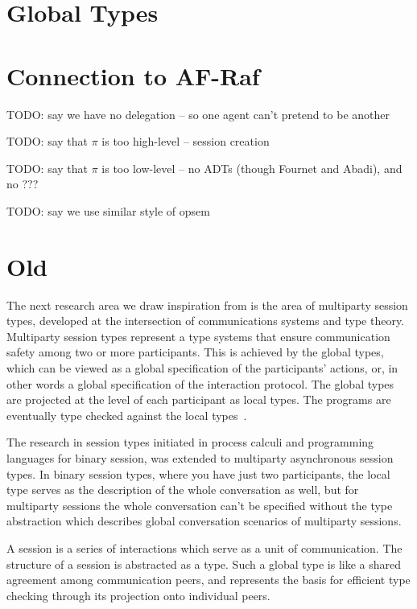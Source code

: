 \documentclass[a4paper,12pt,oneside,fleqn]{book} %
\begin{document}
\section{Global Types}
\label{sec:mast-global}

\section{Connection to AF-Raf}
\label{sec:mast-vs-afraf}

TODO: say we have no delegation -- so one agent can't pretend to be another

TODO: say that $\pi$ is too high-level -- session creation

TODO: say that $\pi$ is too low-level
  -- no ADTs (though Fournet and Abadi), and no ???

TODO: say we use similar style of opsem

\section{Old}



The next research area we draw inspiration from is the area of multiparty
session types, developed at the intersection of communications systems and
type theory. Multiparty session types represent a type systems that ensure
communication safety among two or more participants. This is achieved by
the global types, which can be viewed as a global specification of the
participants' actions, or, in other words a global specification of the
interaction protocol. The global types are projected at the level of each
participant as local types. The programs are eventually type checked
against the local types~\cite{DBLP:journals/jacm/HondaYC16}.

The research in session types initiated in process calculi and programming
languages for binary session, was extended to multiparty asynchronous
session types. In binary session types, where you have just two
participants, the local type serves as the description of the whole
conversation as well, but for multiparty sessions the whole conversation
can't be specified without the type abstraction which describes global
conversation scenarios of multiparty sessions.~\cite{DBLP:journals/jacm/HondaYC16}

A session is a series of interactions which serve as a unit of
communication. The structure of a session is abstracted as a type. Such a
global type is like a shared agreement among communication peers, and
represents the basis for efficient type checking through its projection
onto individual peers.
\end{document}

